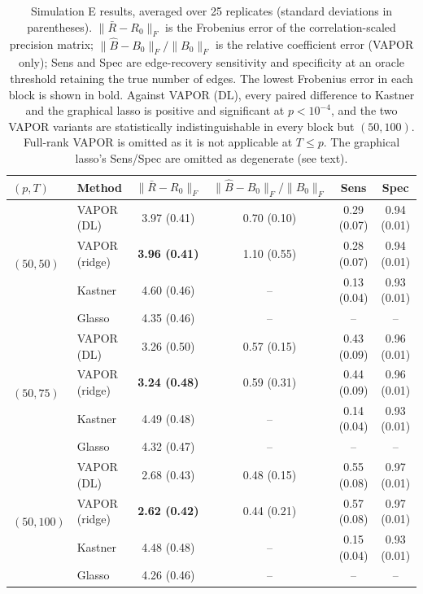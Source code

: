 \begin{table}[t]
\centering
\caption{Simulation E results, averaged over 25 replicates (standard deviations in parentheses). $\|\bar R-R_0\|_F$ is the Frobenius error of the correlation-scaled precision matrix; $\|\hat B-B_0\|_F/\|B_0\|_F$ is the relative coefficient error (VAPOR only); Sens and Spec are edge-recovery sensitivity and specificity at an oracle threshold retaining the true number of edges. The lowest Frobenius error in each block is shown in bold. Against VAPOR (DL), every paired difference to Kastner and the graphical lasso is positive and significant at $p<10^{-4}$, and the two VAPOR variants are statistically indistinguishable in every block but $(50,100)$. Full-rank VAPOR is omitted as it is not applicable at $T\le p$. The graphical lasso's Sens/Spec are omitted as degenerate (see text).}
\label{tab:sim-e}
\small
\begin{tabular}{llcccc}
\toprule
$(p,T)$ & Method & $\|\bar R-R_0\|_F$ & $\|\hat B-B_0\|_F/\|B_0\|_F$ & Sens & Spec \\
\midrule
\multirow{4}{*}{$(50,50)$}
  & VAPOR (DL)    & 3.97 (0.41) & 0.70 (0.10) & 0.29 (0.07) & 0.94 (0.01)\\
  & VAPOR (ridge) & \textbf{3.96 (0.41)} & 1.10 (0.55) & 0.28 (0.07) & 0.94 (0.01)\\
  & Kastner       & 4.60 (0.46) & --          & 0.13 (0.04) & 0.93 (0.01)\\
  & Glasso        & 4.35 (0.46) & --          & --          & --\\
\midrule
\multirow{4}{*}{$(50,75)$}
  & VAPOR (DL)    & 3.26 (0.50) & 0.57 (0.15) & 0.43 (0.09) & 0.96 (0.01)\\
  & VAPOR (ridge) & \textbf{3.24 (0.48)} & 0.59 (0.31) & 0.44 (0.09) & 0.96 (0.01)\\
  & Kastner       & 4.49 (0.48) & --          & 0.14 (0.04) & 0.93 (0.01)\\
  & Glasso        & 4.32 (0.47) & --          & --          & --\\
\midrule
\multirow{4}{*}{$(50,100)$}
  & VAPOR (DL)    & 2.68 (0.43) & 0.48 (0.15) & 0.55 (0.08) & 0.97 (0.01)\\
  & VAPOR (ridge) & \textbf{2.62 (0.42)} & 0.44 (0.21) & 0.57 (0.08) & 0.97 (0.01)\\
  & Kastner       & 4.48 (0.48) & --          & 0.15 (0.04) & 0.93 (0.01)\\
  & Glasso        & 4.26 (0.46) & --          & --          & --\\

\end{tabular}
\end{table}
